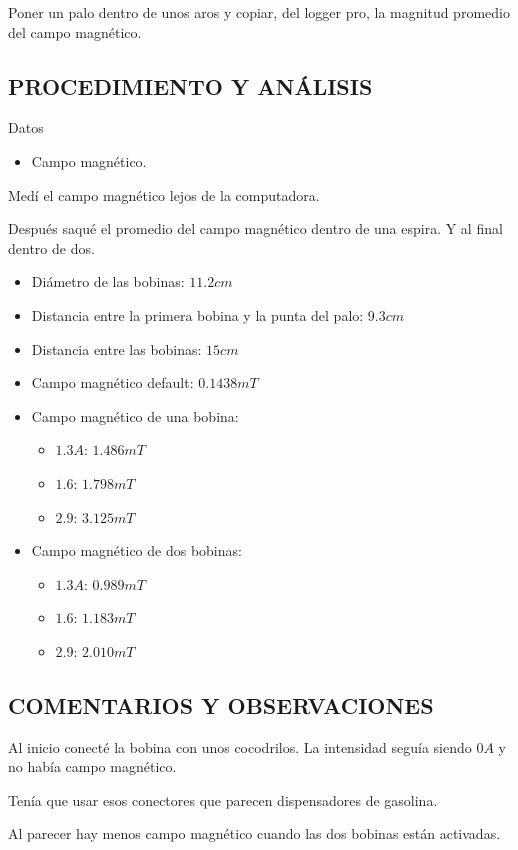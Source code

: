 \documentclass[10pt, twoside]{article}
\begin{document}
Poner un palo dentro de unos aros y copiar, del logger pro, la magnitud promedio
del campo magnético.

\subsection{PROCEDIMIENTO Y ANÁLISIS}%
Datos
\begin{itemize}
	\item Campo magnético.
\end{itemize}

Medí el campo magnético lejos de la computadora.

Después saqué el promedio del campo magnético dentro de una espira.
Y al final dentro de dos.
\begin{itemize}
	\item Diámetro de las bobinas: $11.2cm$
	\item Distancia entre la primera bobina y la punta del palo: $9.3cm$
	\item Distancia entre las bobinas: $15cm$
	\item Campo magnético default: $0.1438mT$
	\item Campo magnético de una bobina:
		\begin{itemize}
			\item $1.3A$: $1.486mT$
			\item $1.6$: $1.798mT$
			\item $2.9$: $3.125mT$
		\end{itemize}
	\item Campo magnético de dos bobinas:
		\begin{itemize}
			\item $1.3A$: $0.989mT$
			\item $1.6$: $1.183mT$
			\item $2.9$: $2.010mT$
		\end{itemize}
\end{itemize}

\subsection{COMENTARIOS Y OBSERVACIONES}%

Al inicio conecté la bobina con unos cocodrilos.
La intensidad seguía siendo $0A$ y no había campo magnético.

Tenía que usar esos conectores que parecen dispensadores de gasolina.

Al parecer hay menos campo magnético cuando las dos bobinas
están activadas.
\end{document}
